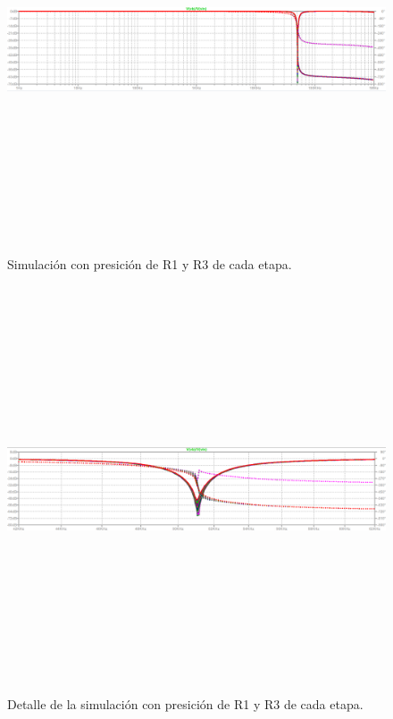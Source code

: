  \begin{figure}[H] %
	\centering	\includegraphics[width=12cm,height=12cm,keepaspectratio]{../EJ4/graficos/ATENUACION.png}
	\caption{Simulaci\'on con presici\'on de R1 y R3 de cada etapa.}
	\label{sim_total}
\end{figure}

 \begin{figure}[H] %
	\centering	\includegraphics[width=12cm,height=12cm,keepaspectratio]{../EJ4/graficos/ATENUACION_ZOOM.png}
	\caption{Detalle de la simulaci\'on con presici\'on de R1 y R3 de cada etapa.}
	\label{sim_total_detalle}
\end{figure}


